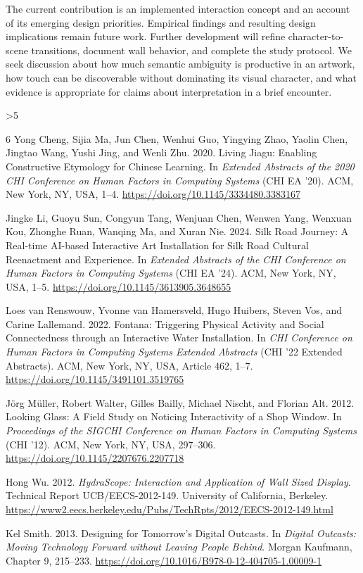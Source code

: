 \documentclass[manuscript,review,anonymous]{acmart}
\begin{document}
The current contribution is an implemented interaction concept and an account of its emerging design priorities. Empirical findings and resulting design implications remain future work. Further development will refine character-to-scene transitions, document wall behavior, and complete the study protocol. We seek discussion about how much semantic ambiguity is productive in an artwork, how touch can be discoverable without dominating its visual character, and what evidence is appropriate for claims about interpretation in a brief encounter.

\clearpage
\ifnum\value{page}>5
  \PackageError{draft-length}{Main text exceeds four pages}{Shorten the main text without changing ACM typography.}
\fi
\begin{thebibliography}{6}
Yong Cheng, Sijia Ma, Jun Chen, Wenhui Guo, Yingying Zhao, Yaolin Chen, Jingtao Wang, Yushi Jing, and Wenli Zhu. 2020.
Living Jiagu: Enabling Constructive Etymology for Chinese Learning.
In \emph{Extended Abstracts of the 2020 CHI Conference on Human Factors in Computing Systems} (CHI EA '20). ACM, New York, NY, USA, 1--4.
\url{https://doi.org/10.1145/3334480.3383167}

Jingke Li, Guoyu Sun, Congyun Tang, Wenjuan Chen, Wenwen Yang, Wenxuan Kou, Zhonghe Ruan, Wanqing Ma, and Xuran Nie. 2024.
Silk Road Journey: A Real-time AI-based Interactive Art Installation for Silk Road Cultural Reenactment and Experience.
In \emph{Extended Abstracts of the CHI Conference on Human Factors in Computing Systems} (CHI EA '24). ACM, New York, NY, USA, 1--5.
\url{https://doi.org/10.1145/3613905.3648655}

Loes van Renswouw, Yvonne van Hamersveld, Hugo Huibers, Steven Vos, and Carine Lallemand. 2022.
Fontana: Triggering Physical Activity and Social Connectedness through an Interactive Water Installation.
In \emph{CHI Conference on Human Factors in Computing Systems Extended Abstracts} (CHI '22 Extended Abstracts). ACM, New York, NY, USA, Article 462, 1--7.
\url{https://doi.org/10.1145/3491101.3519765}

J\"org M\"uller, Robert Walter, Gilles Bailly, Michael Nischt, and Florian Alt. 2012.
Looking Glass: A Field Study on Noticing Interactivity of a Shop Window.
In \emph{Proceedings of the SIGCHI Conference on Human Factors in Computing Systems} (CHI '12). ACM, New York, NY, USA, 297--306.
\url{https://doi.org/10.1145/2207676.2207718}

Hong Wu. 2012.
\emph{HydraScope: Interaction and Application of Wall Sized Display}.
Technical Report UCB/EECS-2012-149. University of California, Berkeley.
\url{https://www2.eecs.berkeley.edu/Pubs/TechRpts/2012/EECS-2012-149.html}

Kel Smith. 2013.
Designing for Tomorrow's Digital Outcasts.
In \emph{Digital Outcasts: Moving Technology Forward without Leaving People Behind}. Morgan Kaufmann, Chapter 9, 215--233.
\url{https://doi.org/10.1016/B978-0-12-404705-1.00009-1}
\end{thebibliography}
\end{document}
